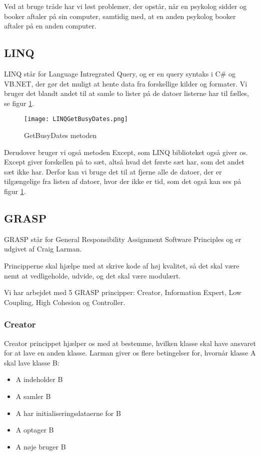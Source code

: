 Ved at bruge tråde har vi løst problemer, der opstår, når en psykolog sidder og booker aftaler på sin computer, samtidig med, at en anden psykolog booker aftaler på en anden computer.

\subsection{LINQ}

LINQ står for Language Intregrated Query, og er en query syntaks i C\# og VB.NET, der gør det muligt at hente data fra forskellige kilder og formater.
Vi bruger det blandt andet til at samle to lister på de datoer listerne har til fælles, se figur \ref{fig:LINQGetBusyDates}.

\begin{figure}[h]
    \caption{GetBusyDates metoden}
    \centering
        \texttt{[image: LINQGetBusyDates.png]}
    \label{fig:LINQGetBusyDates}
\end{figure}

Derudover bruger vi også metoden Except, som LINQ biblioteket også giver os.
Except giver forskellen på to sæt, altså hvad det første sæt har, som det andet sæt ikke har.
Derfor kan vi bruge det til at fjerne alle de datoer, der er tilgængelige fra listen af datoer, hvor der ikke er tid, som det også kan ses på figur \ref{fig:LINQGetBusyDates}.

\subsection{GRASP}
\label{grasp}
GRASP står for General Responsibility Assignment Software Principles og er udgivet af Craig Larman.\cite{larman}

Principperne skal hjælpe med at skrive kode af høj kvalitet, så det skal være nemt at vedligeholde, udvide, og det skal være modulært.

Vi har arbejdet med 5 GRASP principper: Creator, Information 
Expert, Low Coupling, High Cohesion og Controller.

\subsubsection{Creator}

Creator princippet hjælper os med at bestemme, hvilken klasse skal have ansvaret for at lave en anden klasse.
Larman giver os flere betingelser for, hvornår klasse A skal lave klasse B:\cite{larman}

\begin{itemize}
    \item A indeholder B
    \item A samler B
    \item A har initialiseringsdataerne for B
    \item A optager B
    \item A nøje bruger B
\end{itemize}

